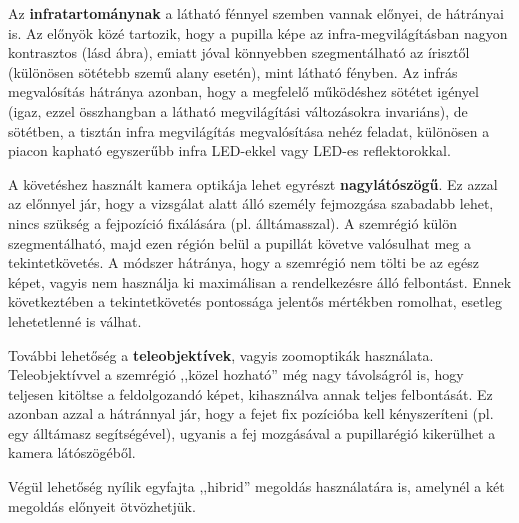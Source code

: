 Az \textbf{infratartománynak} a látható fénnyel szemben vannak előnyei, de hátrányai is. Az előnyök közé tartozik, hogy a pupilla képe az infra-megvilágításban nagyon kontrasztos (lásd  ábra), emiatt jóval könnyebben szegmentálható az írisztől (különösen sötétebb szemű alany esetén), mint látható fényben. Az infrás megvalósítás hátránya azonban, hogy a megfelelő működéshez sötétet igényel (igaz, ezzel összhangban a látható megvilágítási változásokra invariáns), de sötétben, a tisztán infra megvilágítás megvalósítása nehéz feladat, különösen a piacon kapható egyszerűbb infra LED-ekkel vagy LED-es reflektorokkal.

\bigskip

A követéshez használt kamera optikája lehet egyrészt \textbf{nagylátószögű}. Ez azzal az előnnyel jár, hogy a vizsgálat alatt álló személy fejmozgása szabadabb lehet, nincs szükség a fejpozíció fixálására (pl. álltámasszal). A szemrégió külön szegmentálható, majd ezen régión belül a pupillát követve valósulhat meg a tekintetkövetés. A módszer hátránya, hogy a szemrégió nem tölti be az egész képet, vagyis nem használja ki maximálisan a rendelkezésre álló felbontást. Ennek következtében a tekintetkövetés pontossága jelentős mértékben romolhat, esetleg lehetetlenné is válhat.

További lehetőség a \textbf{teleobjektívek}, vagyis zoomoptikák használata. Teleobjektívvel a szemrégió ,,közel hozható'' még nagy távolságról is, hogy teljesen kitöltse a feldolgozandó képet, kihasználva annak teljes felbontását. Ez azonban azzal a hátránnyal jár, hogy a fejet fix pozícióba kell kényszeríteni (pl. egy álltámasz segítségével), ugyanis a fej mozgásával a pupillarégió kikerülhet a kamera látószögéből.

Végül lehetőség nyílik egyfajta ,,hibrid'' megoldás használatára is, amelynél a két megoldás előnyeit ötvözhetjük.